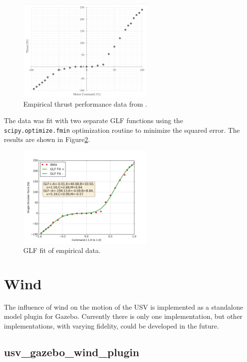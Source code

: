 \documentclass[11pt]{article}
\begin{document}
\begin{figure}[h]
  \centering
  \includegraphics[width=0.6\textwidth]{images/sarda_tcurve.png}
  \caption{Empirical thrust performance data from \cite{sarda17station}.}
  \label{f:sarda}
\end{figure}

The data was fit with two separate GLF functions using the \verb+scipy.optimize.fmin+ optimization routine to minimize the squared error.  The results are shown in Figure\ref{f:fit}.

\begin{figure}[h]
  \centering
  \includegraphics[width=0.6\textwidth]{images/wamv_glf_annote.png}
  \caption{GLF fit of empirical data.}
  \label{f:fit}
\end{figure}


\section{Wind}

The influence of wind on the motion of the USV is implemented as a standalone model plugin for Gazebo.  Currently there is only one implementation, but other implementations, with varying fidelity, could be developed in the future.

\subsection{usv\_gazebo\_wind\_plugin}
\end{document}
